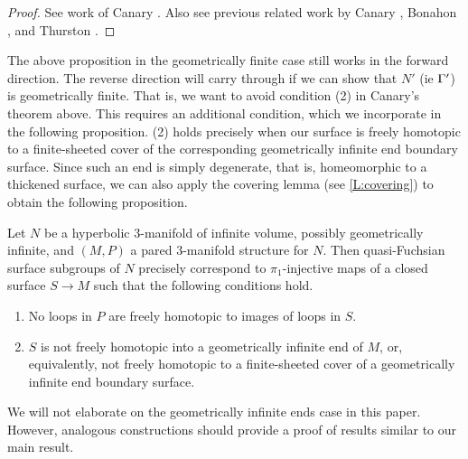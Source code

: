 \begin{proof}

See work of Canary \cite{Canary}. Also see previous related work by Canary
\cite{Canary2}, Bonahon \cite{Bonahon}, and Thurston \cite{Thurstonnotes}.

\end{proof}

The above proposition in the geometrically finite case still works in the
forward direction. The reverse direction will carry through if we can show that
$N'$ (ie $\Gamma'$) is geometrically finite. That is, we want to avoid condition
(2) in Canary's theorem above. This requires an additional condition, which we
incorporate in the following proposition. (2) holds precisely when our surface
is freely homotopic to a finite-sheeted cover of the corresponding
geometrically infinite end boundary surface. Since such an end is simply
degenerate, that is, homeomorphic to a thickened surface, we can also apply the
covering lemma (see \ref{L:covering}) to obtain the following proposition.

\begin{prop}

Let $N$ be a hyperbolic $3$-manifold of infinite volume, possibly geometrically
infinite, and $(M,P)$ a pared $3$-manifold structure for $N$. Then
quasi-Fuchsian surface subgroups of $N$ precisely correspond to
$\pi_1$-injective maps of a closed surface $S \to M$ such that the following
conditions hold.

\begin{enumerate}

\item No loops in $P$ are freely homotopic to images of loops in $S$.

\item $S$ is not freely homotopic into a geometrically infinite end of $M$, or,
equivalently, not freely homotopic to a finite-sheeted cover of a geometrically
infinite end boundary surface.

\end{enumerate}

\end{prop}

We will not elaborate on the geometrically infinite ends case in this paper.
However, analogous constructions should provide a proof of results similar to
our main result.

